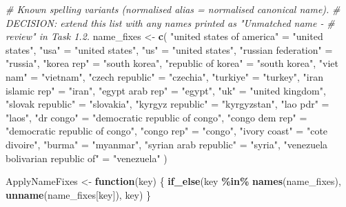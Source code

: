 \documentclass[
]{article}
\newenvironment{Shaded}{\begin{snugshade}}{\end{snugshade}}
\newcommand{\CommentTok}[1]{\textcolor[rgb]{0.56,0.35,0.01}{\textit{#1}}}
\newcommand{\ControlFlowTok}[1]{\textcolor[rgb]{0.13,0.29,0.53}{\textbf{#1}}}
\newcommand{\FunctionTok}[1]{\textcolor[rgb]{0.13,0.29,0.53}{\textbf{#1}}}
\newcommand{\NormalTok}[1]{#1}
\newcommand{\OtherTok}[1]{\textcolor[rgb]{0.56,0.35,0.01}{#1}}
\newcommand{\SpecialCharTok}[1]{\textcolor[rgb]{0.81,0.36,0.00}{\textbf{#1}}}
\newcommand{\StringTok}[1]{\textcolor[rgb]{0.31,0.60,0.02}{#1}}
\begin{document}
\begin{Shaded}
\begin{Highlighting}[]
\CommentTok{\# Known spelling variants (normalised alias = normalised canonical name).}
\CommentTok{\# DECISION: extend this list with any names printed as "Unmatched name {-}}
\CommentTok{\# review" in Task 1.2.}
\NormalTok{name\_fixes }\OtherTok{\textless{}{-}} \FunctionTok{c}\NormalTok{(}
  \StringTok{"united states of america"} \OtherTok{=} \StringTok{"united states"}\NormalTok{,}
  \StringTok{"usa"} \OtherTok{=} \StringTok{"united states"}\NormalTok{,}
  \StringTok{"us"} \OtherTok{=} \StringTok{"united states"}\NormalTok{,}
  \StringTok{"russian federation"} \OtherTok{=} \StringTok{"russia"}\NormalTok{,}
  \StringTok{"korea rep"} \OtherTok{=} \StringTok{"south korea"}\NormalTok{,}
  \StringTok{"republic of korea"} \OtherTok{=} \StringTok{"south korea"}\NormalTok{,}
  \StringTok{"viet nam"} \OtherTok{=} \StringTok{"vietnam"}\NormalTok{,}
  \StringTok{"czech republic"} \OtherTok{=} \StringTok{"czechia"}\NormalTok{,}
  \StringTok{"turkiye"} \OtherTok{=} \StringTok{"turkey"}\NormalTok{,}
  \StringTok{"iran islamic rep"} \OtherTok{=} \StringTok{"iran"}\NormalTok{,}
  \StringTok{"egypt arab rep"} \OtherTok{=} \StringTok{"egypt"}\NormalTok{,}
  \StringTok{"uk"} \OtherTok{=} \StringTok{"united kingdom"}\NormalTok{,}
  \StringTok{"slovak republic"} \OtherTok{=} \StringTok{"slovakia"}\NormalTok{,}
  \StringTok{"kyrgyz republic"} \OtherTok{=} \StringTok{"kyrgyzstan"}\NormalTok{,}
  \StringTok{"lao pdr"} \OtherTok{=} \StringTok{"laos"}\NormalTok{,}
  \StringTok{"dr congo"} \OtherTok{=} \StringTok{"democratic republic of congo"}\NormalTok{,}
  \StringTok{"congo dem rep"} \OtherTok{=} \StringTok{"democratic republic of congo"}\NormalTok{,}
  \StringTok{"congo rep"} \OtherTok{=} \StringTok{"congo"}\NormalTok{,}
  \StringTok{"ivory coast"} \OtherTok{=} \StringTok{"cote divoire"}\NormalTok{,}
  \StringTok{"burma"} \OtherTok{=} \StringTok{"myanmar"}\NormalTok{,}
  \StringTok{"syrian arab republic"} \OtherTok{=} \StringTok{"syria"}\NormalTok{,}
  \StringTok{"venezuela bolivarian republic of"} \OtherTok{=} \StringTok{"venezuela"}
\NormalTok{)}

\NormalTok{ApplyNameFixes }\OtherTok{\textless{}{-}} \ControlFlowTok{function}\NormalTok{(key) \{}
  \FunctionTok{if\_else}\NormalTok{(key }\SpecialCharTok{\%in\%} \FunctionTok{names}\NormalTok{(name\_fixes), }\FunctionTok{unname}\NormalTok{(name\_fixes[key]), key)}
\NormalTok{\}}


\end{Highlighting}
\end{Shaded}
\end{document}
